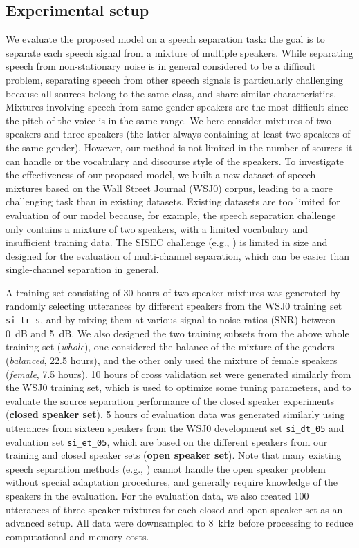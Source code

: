 \documentclass[9pt]{article} \usepackage{nips15submit_e,times}
\begin{document}
\subsection{Experimental setup}
We evaluate the proposed model on a speech separation task: the goal is to separate each speech signal from a mixture of multiple speakers. While separating speech from non-stationary noise is in general considered to be a difficult problem, separating speech from  other speech signals is particularly challenging because all sources belong to the same class, and share similar characteristics.  Mixtures involving speech from same gender speakers are the most difficult since the pitch of the voice is in the same range. We here consider mixtures of two speakers and three speakers (the latter always containing at least two speakers of the same gender).  
However, our method is not limited in the number of sources it can handle or the vocabulary and discourse style of the speakers. 
To investigate the effectiveness of our proposed model, we built a new dataset of speech mixtures based on the Wall Street Journal (WSJ0) corpus, leading to a more challenging task than in existing datasets.
Existing datasets are too limited for evaluation of our model because, for example, the speech separation challenge \cite{cooke2010monaural} only contains a mixture of two speakers, with a limited vocabulary and insufficient training data.  The SISEC challenge (e.g., \cite{vincent2012signal}) is limited in size and designed for the evaluation of multi-channel separation, which can be easier than single-channel separation in general.

A training set consisting of 30 hours of two-speaker mixtures was generated by randomly selecting utterances by different speakers from the WSJ0 training set {\small \verb|si_tr_s|}, and by mixing them at various signal-to-noise ratios (SNR) between 0~dB and 5~dB.
We also designed the two training subsets from the above whole training set ({\it whole}), one considered the balance of the mixture of the genders ({\it balanced}, 22.5 hours), and the other only used the mixture of female speakers ({\it female}, 7.5 hours).
10 hours of cross validation set were generated similarly from the WSJ0 training set, which is used to optimize some tuning parameters, and to evaluate the source separation performance of the closed speaker experiments ({\bf closed speaker set}).
5 hours of evaluation data was generated similarly using utterances from sixteen speakers from the WSJ0 development set {\small \verb|si_dt_05|} and evaluation set {\small \verb|si_et_05|}, which are based on the different speakers from our training and closed speaker sets ({\bf open speaker set}). 
Note that many existing speech separation methods (e.g., \cite{smaragdis2007convolutive,LeRoux2015SparseNMF03}) cannot handle the  open speaker problem without special adaptation procedures, and generally require knowledge of the speakers in the evaluation.  
For the evaluation data, we also created 100 utterances of three-speaker mixtures for each closed and open speaker set as an advanced setup. All data were downsampled to 8~kHz before processing to reduce computational and memory costs.
\end{document}
